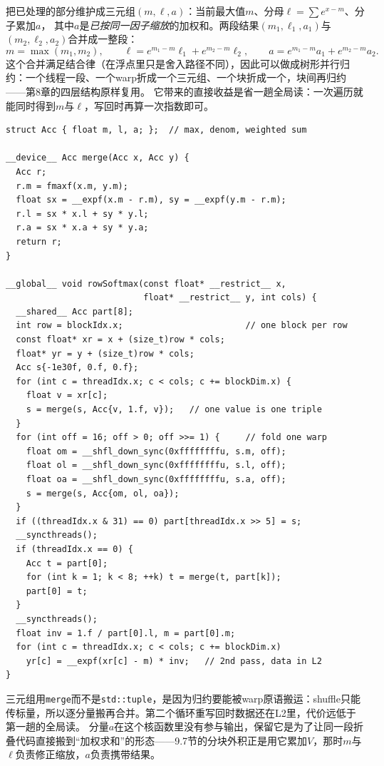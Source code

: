 \documentclass[12pt,a4paper,fontset=fandol]{ctexbook}
\newcommand{\Tp}[1]{\texttt{#1}}
\begin{document}
把已处理的部分维护成三元组$(m,\ell,a)$：当前最大值$m$、分母$\ell=\sum e^{x-m}$、分子累加$a$，
其中$a$是\emph{已按同一因子缩放}的加权和。两段结果$(m_1,\ell_1,a_1)$与$(m_2,\ell_2,a_2)$合并成一整段：
\begin{equation}
m=\max(m_1,m_2),\qquad
\ell=e^{m_1-m}\ell_1+e^{m_2-m}\ell_2,\qquad
a=e^{m_1-m}a_1+e^{m_2-m}a_2 .
\end{equation}
这个合并满足结合律（在浮点里只是舍入路径不同），因此可以做成树形并行归约：一个线程一段、一个warp折成一个三元组、一个块折成一个，块间再归约——第8章的四层结构原样复用。
它带来的直接收益是省一趟全局读：一次遍历就能同时得到$m$与$\ell$，写回时再算一次指数即可。

\begin{lstlisting}[style=cudastyle,caption={在线softmax：三元组合并与块内折叠}]
struct Acc { float m, l, a; };  // max, denom, weighted sum

__device__ Acc merge(Acc x, Acc y) {
  Acc r;
  r.m = fmaxf(x.m, y.m);
  float sx = __expf(x.m - r.m), sy = __expf(y.m - r.m);
  r.l = sx * x.l + sy * y.l;
  r.a = sx * x.a + sy * y.a;
  return r;
}

__global__ void rowSoftmax(const float* __restrict__ x,
                           float* __restrict__ y, int cols) {
  __shared__ Acc part[8];
  int row = blockIdx.x;                        // one block per row
  const float* xr = x + (size_t)row * cols;
  float* yr = y + (size_t)row * cols;
  Acc s{-1e30f, 0.f, 0.f};
  for (int c = threadIdx.x; c < cols; c += blockDim.x) {
    float v = xr[c];
    s = merge(s, Acc{v, 1.f, v});   // one value is one triple
  }
  for (int off = 16; off > 0; off >>= 1) {     // fold one warp
    float om = __shfl_down_sync(0xffffffffu, s.m, off);
    float ol = __shfl_down_sync(0xffffffffu, s.l, off);
    float oa = __shfl_down_sync(0xffffffffu, s.a, off);
    s = merge(s, Acc{om, ol, oa});
  }
  if ((threadIdx.x & 31) == 0) part[threadIdx.x >> 5] = s;
  __syncthreads();
  if (threadIdx.x == 0) {
    Acc t = part[0];
    for (int k = 1; k < 8; ++k) t = merge(t, part[k]);
    part[0] = t;
  }
  __syncthreads();
  float inv = 1.f / part[0].l, m = part[0].m;
  for (int c = threadIdx.x; c < cols; c += blockDim.x)
    yr[c] = __expf(xr[c] - m) * inv;   // 2nd pass, data in L2
}
\end{lstlisting}

三元组用\Tp{merge}而不是\Tp{std::tuple}，是因为归约要能被warp原语搬运：shuffle只能传标量，所以逐分量搬再合并。第二个循环重写回时数据还在L2里，代价远低于第一趟的全局读。
分量$a$在这个核函数里没有参与输出，保留它是为了让同一段折叠代码直接搬到``加权求和''的形态——9.7节的分块外积正是用它累加$V$，那时$m$与$\ell$负责修正缩放，$a$负责携带结果。
\end{document}
